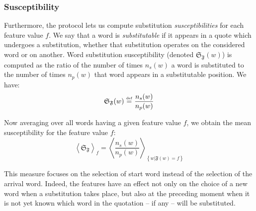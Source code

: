\subsubsection{Susceptibility}

Furthermore, the protocol lets us compute substitution \emph{susceptibilities} for each feature value $f$.
We say that a word is \emph{substitutable} if it appears in a quote which undergoes a substitution, whether that substitution operates on the considered word or on another.
Word substitution susceptibility (denoted $\mathfrak{S}_{\mathfrak{F}}(w)$) is computed as the ratio of the number of times $n_s(w)$ a word is substituted to the number of times $n_p(w)$ that word appears in a substitutable position.
We have:
$$\mathfrak{S}_{\mathfrak{F}}(w) \overset{\underset{\mathrm{def}}{}}{=} \frac{n_s(w)}{n_p(w)}$$

Now averaging over all words having a given feature value $f$, we obtain the mean susceptibility for the feature value $f$:
$$\left< \mathfrak{S}_{\mathfrak{F}} \right>_f = \left< \frac{n_s(w)}{n_p(w)} \right>_{\left\lbrace w | \mathfrak{F}(w) = f \right\rbrace}$$

This measure focuses on the selection of start word instead of the selection of the arrival word.
Indeed, the features have an effect not only on the choice of a new word when a substitution takes place, but also at the preceding moment when it is not yet known which word in the quotation -- if any -- will be substituted.
